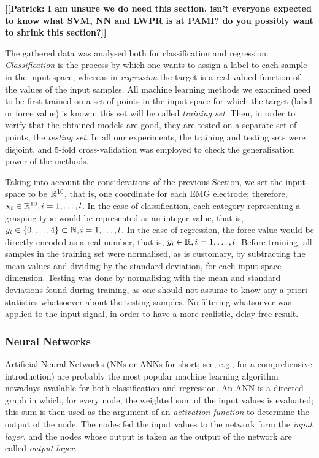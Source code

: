 \textbf{[[Patrick: I am unsure we do need this section. isn't everyone
expected to know what SVM, NN and LWPR is at PAMI? do you possibly want to
shrink this section?]]}

The gathered data was analysed both for classification and
regression. \emph{Classification} is the process by which one wants to
assign a label to each sample in the input space, whereas in
\emph{regression} the target is a real-valued function of the values
of the input samples. All machine learning methods we examined need to
be first trained on a set of points in the input space for which the
target (label or force value) is known; this set will be called
\emph{training set}. Then, in order to verify that the obtained models
are good, they are tested on a separate set of points, the
\emph{testing set}. In all our experiments, the training and testing
sets were disjoint, and $5$-fold cross-validation was employed to
check the generalisation power of the methods.

Taking into account the considerations of the previous Section, we set
the input space to be $\mathbb{R}^{10}$, that is, one coordinate for each EMG
electrode; therefore, $\mathbf{x}_i \in \mathbb{R}^{10}, i=1,\ldots,l$. In the case
of classification, each category representing a grasping type would be
represented as an integer value, that is, $y_i \in \{0,\ldots,4\}
\subset \mathbb{N}, i=1,\ldots,l$. In the case of regression, the force value
would be directly encoded as a real number, that is, $y_i \in \mathbb{R},
i=1,\ldots,l$. Before training, all samples in the training set were
normalised, as is customary, by subtracting the mean values and
dividing by the standard deviation, for each input space
dimension. Testing was done by normalising with the mean and standard
deviations found during training, as one should not assume to know any
a-priori statistics whatsoever about the testing samples. No filtering
whatsoever was applied to the input signal, in order to have a more
realistic, delay-free result.

\subsubsection{Neural Networks}

Artificial Neural Networks (NNs or ANNs for short; see, e.g.,
\cite{bishop} for a comprehensive introduction) are probably the most
popular machine learning algorithm nowadays available for both
classification and regression. An ANN is a directed graph in which,
for every node, the weighted sum of the input values is evaluated;
this sum is then used as the argument of an \emph{activation function}
to determine the output of the node. The nodes fed the input values to
the network form the \emph{input layer}, and the nodes whose output is
taken as the output of the network are called \emph{output
layer}.


